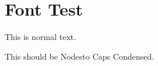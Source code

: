 \documentclass[fonts=plain]{dndbook}
\begin{document}
\section{Font Test}

This is normal text.

{\booktitlefont This should be Nodesto Caps Condensed.}
\end{document}
